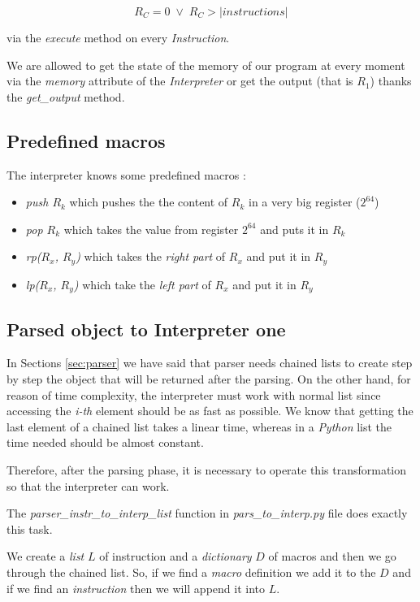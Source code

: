 \[ R_C = 0\; \lor\; R_C> |instructions| \]

via the \textit{execute} method on every \textit{Instruction}.

We are allowed to get the state of the memory of our program at every moment via the \textit{memory} attribute of the \textit{Interpreter} or get the output (that is $R_1$) thanks the \textit{get\_output} method.
\newpage
\subsection{Predefined macros}

The interpreter knows some predefined macros :
\begin{itemize}
    \item \textit{push $R_k$} which pushes the the content of $R_k$ in a very big register ($2^{64}$)
    \item \textit{pop $R_k$} which takes the value from register $2^{64}$ and puts it in $R_k$
    \item \textit{rp($R_x$, $R_y$)} which takes the \textit{right part} of $R_x$ and put it in $R_y$
    \item \textit{lp($R_x$, $R_y$)} which take the \textit{left part} of $R_x$ and put it in $R_y$
\end{itemize}

\subsection{Parsed object to Interpreter one}

In Sections \ref{sec:parser} we have said that parser needs chained lists to create step by step the object that will be returned after the parsing. On the other hand, for reason of time complexity, the interpreter must work with normal list since accessing the \textit{i-th} element should be as fast as possible. We know that getting the last element of a chained list takes a linear time, whereas in a \textit{Python} list the time needed should be almost constant.

Therefore, after the parsing phase, it is necessary to operate this transformation so that the interpreter can work.

The \textit{parser\_instr\_to\_interp\_list} function in \textit{pars\_to\_interp.py} file does exactly this task.

We create a \textit{list} $L$ of instruction and a \textit{dictionary} $D$ of macros and then we go through the chained list. So, if we find a \textit{macro} definition we add it to the $D$ and if we find an \textit{instruction} then we will append it into $L$.



